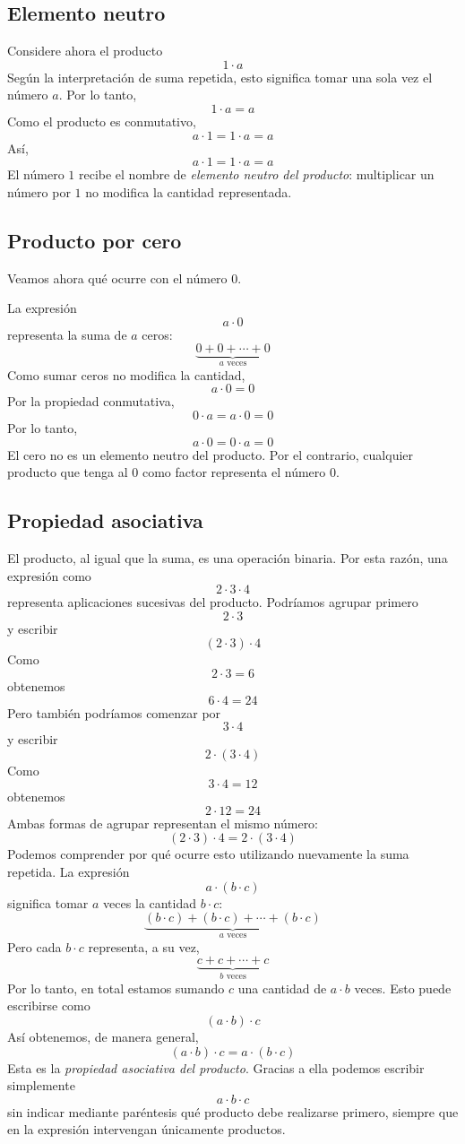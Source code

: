 \subsection{Elemento neutro}

Considere ahora el producto
\[
1\cdot a
\]
Según la interpretación de suma repetida, esto significa tomar una sola vez el número \(a\). Por lo tanto,
\[
1\cdot a=a
\]
Como el producto es conmutativo,
\[
a\cdot1=1\cdot a=a
\]
Así,
\[
a\cdot1=1\cdot a=a
\]
El número \(1\) recibe el nombre de \emph{elemento neutro del producto}: multiplicar un número por \(1\) no modifica la cantidad representada.

\subsection{Producto por cero}

Veamos ahora qué ocurre con el número \(0\).

La expresión
\[
a\cdot0
\]
representa la suma de \(a\) ceros:
\[
\underbrace{0+0+\cdots+0}_{a\text{ veces}}
\]
Como sumar ceros no modifica la cantidad,
\[
a\cdot0=0
\]
Por la propiedad conmutativa,
\[
0\cdot a=a\cdot0=0
\]
Por lo tanto,
\[
a\cdot0=0\cdot a=0
\]
El cero no es un elemento neutro del producto. Por el contrario, cualquier producto que tenga al \(0\) como factor representa el número \(0\).

\subsection{Propiedad asociativa}

El producto, al igual que la suma, es una operación binaria. Por esta razón, una expresión como
\[
2\cdot3\cdot4
\]
representa aplicaciones sucesivas del producto.
Podríamos agrupar primero
\[
2\cdot3
\]
y escribir
\[
(2\cdot3)\cdot4
\]
Como
\[
2\cdot3=6
\]
obtenemos
\[
6\cdot4=24
\]
Pero también podríamos comenzar por
\[
3\cdot4
\]
y escribir
\[
2\cdot(3\cdot4)
\]
Como
\[
3\cdot4=12
\]
obtenemos
\[
2\cdot12=24
\]
Ambas formas de agrupar representan el mismo número:
\[
(2\cdot3)\cdot4
=
2\cdot(3\cdot4)
\]
Podemos comprender por qué ocurre esto utilizando nuevamente la suma repetida.
La expresión
\[
a\cdot(b\cdot c)
\]
significa tomar \(a\) veces la cantidad \(b\cdot c\):
\[
\underbrace{(b\cdot c)+(b\cdot c)+\cdots+(b\cdot c)}_{a\text{ veces}}
\]
Pero cada \(b\cdot c\) representa, a su vez,
\[
\underbrace{c+c+\cdots+c}_{b\text{ veces}}
\]
Por lo tanto, en total estamos sumando \(c\) una cantidad de \(a\cdot b\) veces. Esto puede escribirse como
\[
(a\cdot b)\cdot c
\]
Así obtenemos, de manera general,
\[
(a\cdot b)\cdot c
=
a\cdot(b\cdot c)
\]
Esta es la \emph{propiedad asociativa del producto}.
Gracias a ella podemos escribir simplemente
\[
a\cdot b\cdot c
\]
sin indicar mediante paréntesis qué producto debe realizarse primero, siempre que en la expresión intervengan únicamente productos.

